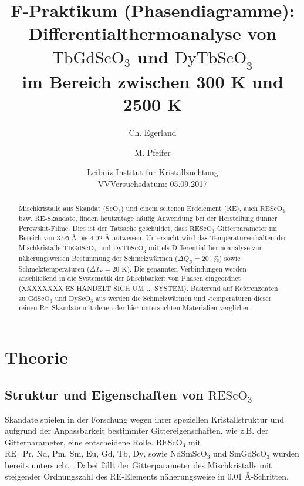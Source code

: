 \documentclass[aps,twocolumn,secnumarabic,nobalancelastpage,amsmath,amssymb,
nofootinbib,superscriptaddress]{revtex4-1}
\begin{document}
\title{F-Praktikum (Phasendiagramme):\\Differentialthermoanalyse von $\text{TbGdScO}_3$
und $\text{DyTbScO}_3$\\im Bereich zwischen 300 K und 2500 K}
\author         {Ch. Egerland}
\author         {M. Pfeifer}
\date[Versuchsort: ]{Leibniz-Institut für Kristallzüchtung \\ VVVersuchsdatum: 05.09.2017}


\begin{abstract}
Mischkristalle aus Skandat ($\text{ScO}_3$) und einem seltenen Erdelement (RE), auch $\text{REScO}_3$ bzw. RE-Skandate, finden heutzutage häufig Anwendung bei der Herstellung
dünner Perowskit-Filme. Dies ist der Tatsache geschuldet, dass $\text{REScO}_3$ Gitterparameter im Bereich von 3.95 \AA$\text{ bis}$ 4.02 \AA$\text{ aufweisen.}$
Untersucht wird das Temperaturverhalten der Mischkristalle $\text{TbGdScO}_3$ und $\text{DyTbScO}_3$ mittels
Differentialthermoanalyse zur näherungsweisen Bestimmung der Schmelzwärmen ($\Delta Q_S=20\text{ }\%$) sowie Schmelztemperaturen ($\Delta T_S=20\text{ K}$).
Die genannten Verbindungen werden anschließend in die Systematik der Mischbarkeit von Phasen eingeordnet (XXXXXXXX ES HANDELT SICH UM ... SYSTEM).
Basierend auf Referenzdaten zu $\text{Gd}\text{ScO}_3$ und $\text{Dy}\text{ScO}_3$ aus \cite{paperK} werden die Schmelzwärmen und -temperaturen dieser
reinen RE-Skandate mit denen der hier untersuchten Materialien verglichen.
\end{abstract}


\maketitle


\section{Theorie}
\subsection{Struktur und Eigenschaften von $\text{REScO}_3$}
\noindent Skandate spielen in der Forschung wegen ihrer speziellen Kristallstruktur und aufgrund der Anpassbarkeit bestimmter Gittereigenschaften, wie z.B. der
Gitterparameter, eine entscheidene Rolle. $\text{REScO}_3$ mit $\text{RE=Pr, Nd, Pm, Sm, Eu, Gd, Tb, Dy}$, sowie $\text{NdSmScO}_3$ und $\text{SmGdScO}_3$ wurden bereits untersucht \cite{paperK}.
Dabei fällt der Gitterparameter des Mischkristalls mit steigender Ordnungszahl des RE-Elements näherungsweise in 0.01 \AA-Schritten. \cite{paperK}
\end{document}
